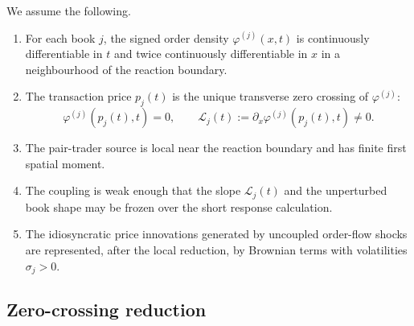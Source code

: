 \documentclass[5p,final]{elsarticle}
\begin{document}
We assume the following.
\begin{enumerate}
\item[(B1)] For each book $j$, the signed order density $\varphi^{(j)}(x,t)$ is continuously differentiable in $t$ and twice continuously differentiable in $x$ in a neighbourhood of the reaction boundary.
\item[(B2)] The transaction price $p_j(t)$ is the unique transverse zero crossing of $\varphi^{(j)}$:
\begin{equation}
\varphi^{(j)}(p_j(t),t)=0,
\qquad
\mathcal L_j(t):=\partial_x\varphi^{(j)}(p_j(t),t)\neq0.
\end{equation}
\item[(B3)] The pair-trader source is local near the reaction boundary and has finite first spatial moment.
\item[(B4)] The coupling is weak enough that the slope $\mathcal L_j(t)$ and the unperturbed book shape may be frozen over the short response calculation. 
\item[(B5)] The idiosyncratic price innovations generated by uncoupled order-flow shocks are represented, after the local reduction, by Brownian terms with volatilities $\sigma_j>0$.
\end{enumerate}

\subsection{Zero-crossing reduction}
\end{document}
